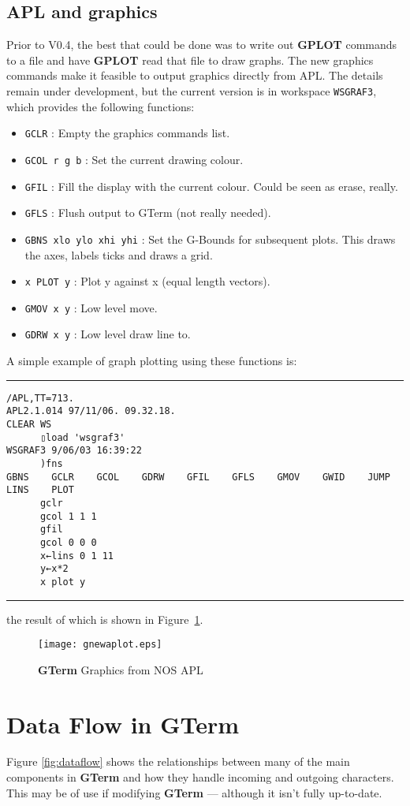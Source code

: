 \documentclass[a4paper,twoside,11pt]{article}
\makeatletter
\def\maxwidth{%
  \ifdim\Gin@nat@width>\linewidth
    \linewidth
  \else
    \Gin@nat@width
  \fi
}
\newcommand{\newpara}{\par\vspace{4mm}\noindent}
\makeatother
\begin{document}
\subsection{APL and graphics}
Prior to V0.4, the best that could be done was to write out \textbf{GPLOT} commands to a file and have \textbf{GPLOT} read that
file to draw graphs. The new graphics commands make it feasible to output graphics directly from APL.
The details remain under development, but the current version is in workspace \texttt{WSGRAF3}, which provides
the following functions:

\begin{itemize}
\item \texttt{GCLR} : Empty the graphics commands list.
\item \texttt{GCOL r g b} : Set the current drawing colour.
\item \texttt{GFIL} : Fill the display with the current colour. Could be seen as erase, really.
\item \texttt{GFLS} : Flush output to GTerm (not really needed).
\item \texttt{GBNS xlo ylo xhi yhi} : Set the G-Bounds for subsequent plots. This draws the axes, labels ticks and draws a grid.
\item \texttt{x PLOT y} : Plot y against x (equal length vectors).
\item \texttt{GMOV x y} : Low level move.
\item \texttt{GDRW x y} : Low level draw line to.
\end{itemize}

\newpara
A simple example of graph plotting using these functions is:
\newpara
\hrule
{\scriptsize
\begin{verbatim}
/APL,TT=713.
APL2.1.014 97/11/06. 09.32.18.
CLEAR WS
      ▯load 'wsgraf3'
WSGRAF3 9/06/03 16:39:22
      )fns
GBNS    GCLR    GCOL    GDRW    GFIL    GFLS    GMOV    GWID    JUMP    LINS    PLOT
      gclr
      gcol 1 1 1
      gfil
      gcol 0 0 0
      x←lins 0 1 11
      y←x*2
      x plot y
\end{verbatim}
}
\hrule
\newpara
the result of which is shown in Figure~\ref{fig:graf2}.

\begin{figure}
	\centering
		\texttt{[image: gnewaplot.eps]}
	\caption{\textbf{GTerm} Graphics from NOS APL}
	\label{fig:graf2}
\end{figure}


\section{Data Flow in \textbf{GTerm}}
Figure \ref{fig:dataflow} shows the relationships between many of the
main components in \textbf{GTerm} and how they handle incoming and outgoing characters.
This may be of use if modifying \textbf{GTerm} --- although it isn't fully up-to-date.
\end{document}
